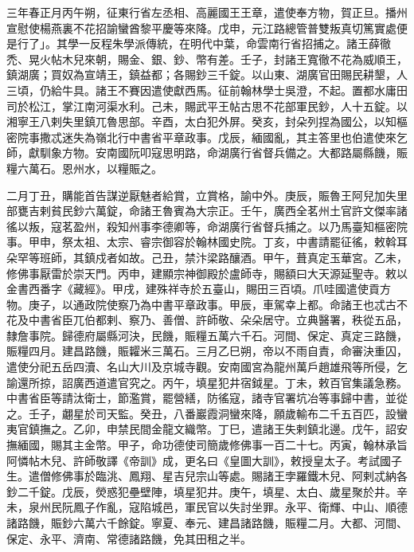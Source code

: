 
\begin{pinyinscope}

 三年春正月丙午朔，征東行省左丞相、高麗國王王章，遣使奉方物，賀正旦。播州宣慰使楊燕裏不花招諭蠻酋黎平慶等來降。戊申，元江路總管普雙叛真切篤實處便是行了」。其學一反程朱學派傳統，在明代中葉，命雲南行省招捕之。諸王薛徹禿、晃火帖木兒來朝，賜金、銀、鈔、幣有差。壬子，封諸王寬徹不花為威順王，鎮湖廣；買奴為宣靖王，鎮益都；各賜鈔三千錠。以山東、湖廣官田賜民耕墾，人三頃，仍給牛具。諸王不賽因遣使獻西馬。征前翰林學士吳澄，不起。置都水庸田司於松江，掌江南河渠水利。己未，賜武平王帖古思不花部軍民鈔，人十五錠。以湘寧王八剌失里鎮兀魯思部。辛酉，太白犯外屏。癸亥，封朵列捏為國公，以知樞密院事撒忒迷失為嶺北行中書省平章政事。戊辰，緬國亂，其主答里也伯遣使來乞師，獻馴象方物。安南國阮叩寇思明路，命湖廣行省督兵備之。大都路屬縣饑，賑糧六萬石。恩州水，以糧賑之。



 二月丁丑，購能首告謀逆厭魅者給賞，立賞格，諭中外。庚辰，賑魯王阿兒加失里部甕吉剌貧民鈔六萬錠，命諸王魯賓為大宗正。壬午，廣西全茗州土官許文傑率諸徭以叛，寇茗盈州，殺知州事李德卿等，命湖廣行省督兵捕之。以乃馬臺知樞密院事。甲申，祭太祖、太宗、睿宗御容於翰林國史院。丁亥，中書請罷征徭，敕斡耳朵罕等班師，其鎮戍者如故。己丑，禁汴梁路釀酒。甲午，葺真定玉華宮。乙未，修佛事厭雷於崇天門。丙申，建顯宗神御殿於盧師寺，賜額曰大天源延聖寺。敕以金書西番字《藏經》。甲戌，建殊祥寺於五臺山，賜田三百頃。爪哇國遣使貢方物。庚子，以通政院使察乃為中書平章政事。甲辰，車駕幸上都。命諸王也忒古不花及中書省臣兀伯都剌、察乃、善僧、許師敬、朵朵居守。立典醫署，秩從五品，隸詹事院。歸德府屬縣河決，民饑，賑糧五萬六千石。河間、保定、真定三路饑，賑糧四月。建昌路饑，賑糶米三萬石。三月乙巳朔，帝以不雨自責，命審決重囚，遣使分祀五岳四瀆、名山大川及京城寺觀。安南國宮為龍州萬戶趙雄飛等所侵，乞諭還所掠，詔廣西道遣官究之。丙午，填星犯井宿鉞星。丁未，敕百官集議急務。中書省臣等請汰衛士，節濫賞，罷營繕，防徭寇，諸寺官署坑冶等事歸中書，並從之。壬子，翽星於司天監。癸丑，八番巖霞洞蠻來降，願歲輸布二千五百匹，設蠻夷官鎮撫之。乙卯，申禁民間金龍文織幣。丁巳，遣諸王失剌鎮北邊。戊午，詔安撫緬國，賜其主金幣。甲子，命功德使司簡歲修佛事一百二十七。丙寅，翰林承旨阿憐帖木兒、許師敬譯《帝訓》成，更名曰《皇圖大訓》，敕授皇太子。考試國子生。遣僧修佛事於臨洮、鳳翔、星吉兒宗山等處。賜諸王孛羅鐵木兒、阿剌忒納各鈔二千錠。戊辰，熒惑犯壘壁陣，填星犯井。庚午，填星、太白、歲星聚於井。辛未，泉州民阮鳳子作亂，寇陷城邑，軍民官以失討坐罪。永平、衛輝、中山、順德諸路饑，賑鈔六萬六千餘錠。寧夏、奉元、建昌諸路饑，賑糧二月。大都、河間、保定、永平、濟南、常德諸路饑，免其田租之半。




\end{pinyinscope}
